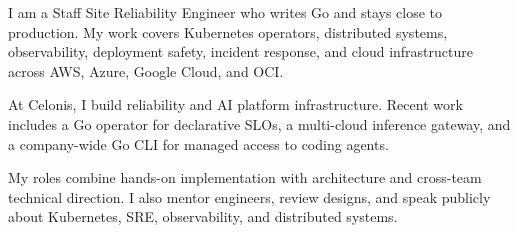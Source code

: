 I am a Staff Site Reliability Engineer who writes Go and stays close to production. My work covers Kubernetes operators, distributed systems, observability, deployment safety, incident response, and cloud infrastructure across AWS, Azure, Google Cloud, and OCI.

At Celonis, I build reliability and AI platform infrastructure. Recent work includes a Go operator for declarative SLOs, a multi-cloud inference gateway, and a company-wide Go CLI for managed access to coding agents.

My roles combine hands-on implementation with architecture and cross-team technical direction. I also mentor engineers, review designs, and speak publicly about Kubernetes, SRE, observability, and distributed systems.
